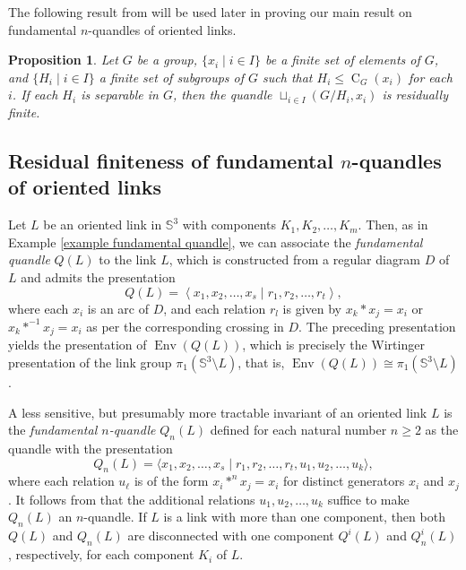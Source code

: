 \documentclass[12pt]{amsart}
\newtheorem{prop}[theorem]{Proposition}
\theoremstyle{definition}
\numberwithin{equation}{subsection}
\newcommand{\Env}{\operatorname{Env}}
\newcommand{\C}{\operatorname{C}}
\begin{document}
The following result from \cite[Proposition 3.4]{MR4075375} will be used later in proving our main result on  fundamental $n$-quandles of oriented links.

\begin{prop}\label{res-finite-quandle}
Let $G$ be a group, $\{x_i \mid i \in I \}$ be a finite set of elements of $G$, and $\{H_i \mid i \in I \}$ a finite set of subgroups of $G$ such that $H_i \le \C_G(x_i)$ for each $i$. If each $H_i$ is separable in $G$, then the quandle $\sqcup_{i \in I}(G/H_i,x_i)$ is residually finite.
\end{prop}
\medskip

\subsection{Residual finiteness of fundamental $n$-quandles of oriented links}

Let $L$ be an oriented link in $\mathbb{S}^3$ with components $K_1, K_2, \ldots, K_m$. Then, as in Example \ref{example fundamental quandle}, we can associate the {\it fundamental quandle} $Q(L)$ to the link $L$, which is constructed from a regular diagram $D$ of $L$ and admits the presentation
$$
Q(L)=\left\langle x_{1}, x_2, \ldots, x_{s} \mid r_{1}, r_2, \ldots, r_{t}\right\rangle,
$$
where each $x_i$ is an arc of $D$, and each relation $r_l$ is given by  $x_k*x_j=x_i$ or $x_k*^{-1}x_j=x_i$ as per the corresponding crossing in $D$. The preceding presentation yields the presentation of $\Env(Q(L))$, which is precisely the Wirtinger presentation of the link group $\pi_1(\mathbb{S}^{3} \setminus L)$, that is, $\Env(Q(L)) \cong \pi_1(\mathbb{S}^{3} \setminus L)$.
\par

A less sensitive, but presumably more tractable invariant of an oriented link $L$ is the {\it fundamental $n$-quandle} $Q_n(L)$ defined for each natural number $n \ge 2$ as the quandle with the presentation
$$Q_{n}(L)=\langle x_{1}, x_2, \ldots, x_{s} \mid r_{1}, r_2, \ldots, r_{t}, u_{1}, u_2, \ldots, u_{k}\rangle,$$
where each relation $u_{\ell}$ is of the form $x_{i} \ast^{n} x_{j}=x_i$ for distinct generators $x_{i}$ and $x_{j}$. It follows from \cite[Proposition 3.1]{DhanwaniSingh2024} that the additional relations $u_{1}, u_2, \ldots, u_{k}$ suffice to make $Q_{n}(L)$ an $n$-quandle. If $L$ is a link with more than one component, then both $Q(L)$ and $Q_n(L)$ are disconnected with one component $Q^i(L)$ and $Q^i_n(L)$, respectively, for each component $K_i$ of $L$.
\par 
\end{document}
